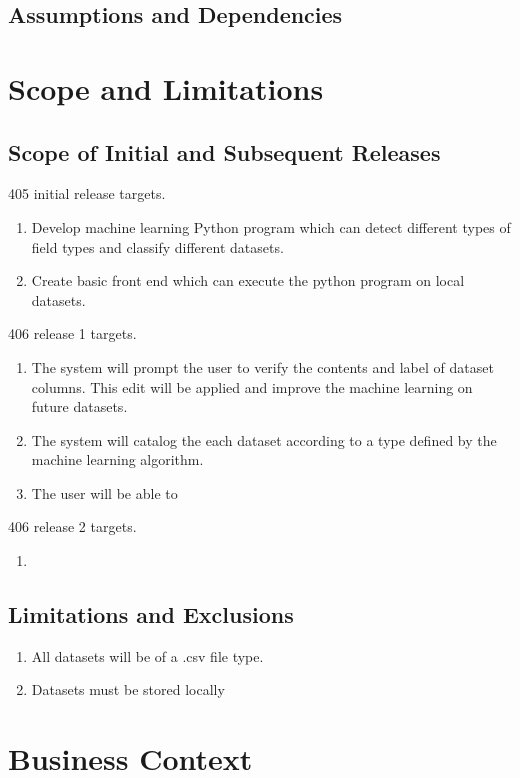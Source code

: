 \documentclass[12pt,oneside,letterpaper]{article}
\begin{document}
\subsection{Assumptions and Dependencies}



\newpage
\section{Scope and Limitations}
\subsection{Scope of Initial and Subsequent Releases}
405 initial release targets.
\begin{enumerate}
    \item Develop machine learning Python program which can detect different types of field types and classify different datasets.
    \item Create basic front end which can execute the python program on local datasets.
\end{enumerate}  
406 release 1 targets.
\begin{enumerate}
    \item The system will prompt the user to verify the contents and label of dataset columns. This edit will be applied and improve the machine learning on future datasets.
    \item The system will catalog the each dataset according to a type defined by the machine learning algorithm.
    \item The user will be able to 
\end{enumerate}
406 release 2 targets.
\begin{enumerate}
    \item 
\end{enumerate}
\subsection{Limitations and Exclusions}
\begin{enumerate}
    \item All datasets will be of a .csv file type.
    \item Datasets must be stored locally
\end{enumerate}




\section{Business Context}
\end{document}
